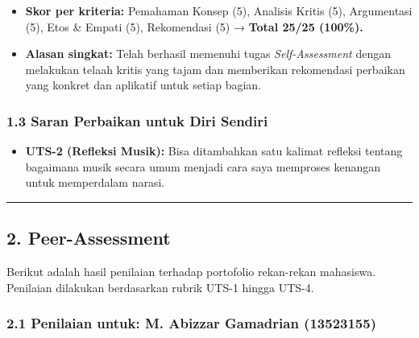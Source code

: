 \documentclass[
  letterpaper,
  DIV=11,
  numbers=noendperiod]{scrreprt}
\providecommand{\tightlist}{%
  \setlength{\itemsep}{0pt}\setlength{\parskip}{0pt}}
\begin{document}
\begin{itemize}
\tightlist
\item
  \textbf{Skor per kriteria:} Pemahaman Konsep (5), Analisis Kritis (5),
  Argumentasi (5), Etos \& Empati (5), Rekomendasi (5) → \textbf{Total
  25/25 (100\%).}
\item
  \textbf{Alasan singkat:} Telah berhasil memenuhi tugas
  \emph{Self-Assessment} dengan melakukan telaah kritis yang tajam dan
  memberikan rekomendasi perbaikan yang konkret dan aplikatif untuk
  setiap bagian.
\end{itemize}

\subsubsection{1.3 Saran Perbaikan untuk Diri
Sendiri}\label{saran-perbaikan-untuk-diri-sendiri}

\begin{itemize}
\tightlist
\item
  \textbf{UTS-2 (Refleksi Musik):} Bisa ditambahkan satu kalimat
  refleksi tentang bagaimana musik secara umum menjadi cara saya
  memproses kenangan untuk memperdalam narasi.
\end{itemize}

\begin{center}\rule{0.5\linewidth}{0.5pt}\end{center}

\subsection{2. Peer-Assessment}\label{peer-assessment}

Berikut adalah hasil penilaian terhadap portofolio rekan-rekan
mahasiswa. Penilaian dilakukan berdasarkan rubrik UTS-1 hingga UTS-4.

\subsubsection{2.1 Penilaian untuk: M. Abizzar Gamadrian
(13523155)}\label{penilaian-untuk-m.-abizzar-gamadrian-13523155}
\end{document}
